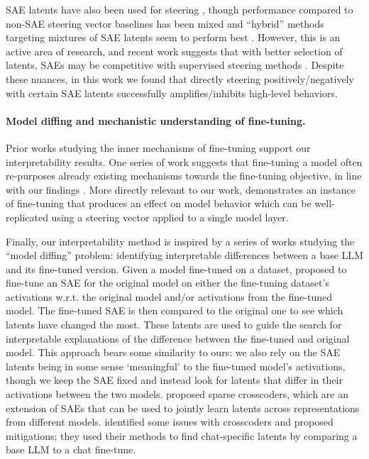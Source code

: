 SAE latents have also been used for steering \citep{durmus2024evaluating,templeton2024scaling}, though performance compared to non-SAE steering vector baselines has been mixed \citep{karvonen2024sieve,nanda2024progress} and ``hybrid'' methods targeting mixtures of SAE latents seem to perform best \citep{chalnev2024improvingsteeringvectorstargeting,kharlapenko2024extracting}. However, this is an active area of research, and recent work suggests that with better selection of latents, SAEs may be competitive with supervised steering methods \citep{arad2025saesgoodsteering}. Despite these nuances, in this work we found that directly steering positively/negatively with certain SAE latents successfully amplifies/inhibits high-level behaviors.

\paragraph{Model diffing and mechanistic understanding of fine-tuning.}
Prior works studying the inner mechanisms of fine-tuning support our interpretability results. One series of work suggests that fine-tuning a model often re-purposes already existing mechanisms towards the fine-tuning objective, in line with our findings \citep{hao2020investigating,prakash2024finetuningenhancesexistingmechanisms,lee2024mechanisticunderstandingalignmentalgorithms}. More directly relevant to our work, \citep{engels2025awareness} demonstrates an instance of fine-tuning that produces an effect on model behavior which can be well-replicated using a steering vector applied to a single model layer. 

Finally, our interpretability method is inspired by a series of works studying the ``model diffing'' problem: identifying interpretable differences between a base LLM and its fine-tuned version. Given a model fine-tuned on a dataset, \citet{BrickenEtAl2024StageWiseDiffing} proposed to fine-tune an SAE for the original model on either the fine-tuning dataset's activations w.r.t. the original model and/or activations from the fine-tuned model. The fine-tuned SAE is then compared to the original one to see which latents have changed the most. These latents are used to guide the search for interpretable explanations of the difference between the fine-tuned and original model. This approach bears some similarity to ours: we also rely on the SAE latents being in some sense `meaningful' to the fine-tuned model's activations, though we keep the SAE fixed and instead look for latents that differ in their activations between the two models. 
\citet{lindsey2024crosscoders} proposed sparse crosscoders, which are an extension of SAEs that can be used to jointly learn latents across representations from different models.  \citep{minder2025robustlyidentifyingconceptsintroduced} identified some issues
with crosscoders and proposed mitigations; they used their methods to find
chat-specific latents by comparing a base LLM to a chat fine-tune.  

